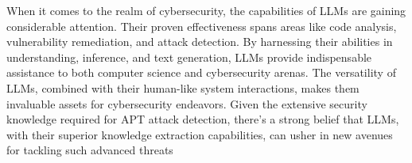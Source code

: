 When it comes to the realm of cybersecurity, the capabilities of LLMs are gaining considerable attention. Their proven effectiveness spans areas like code analysis, vulnerability remediation, and attack detection. By harnessing their abilities in understanding, inference, and text generation, LLMs provide indispensable assistance to both computer science and cybersecurity arenas. The versatility of LLMs, combined with their human-like system interactions, makes them invaluable assets for cybersecurity endeavors. Given the extensive security knowledge required for APT attack detection, there's a strong belief that LLMs, with their superior knowledge extraction capabilities, can usher in new avenues for tackling such advanced threats





